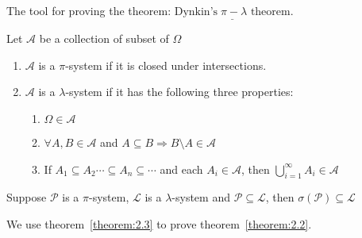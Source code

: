 \documentclass[11pt]{article}
\begin{document}
\vspace*{5mm}
The tool for proving the theorem: $\underline{\text{Dynkin's} \;\pi-\lambda \text{ theorem}}$.

\begin{definition}
    Let $\mathcal{A}$ be a collection of subset of $\Omega$
    \begin{enumerate}
        \item $\mathcal{A}$ is a $\pi$-system if it is closed under intersections.
        \item $\mathcal{A}$ is a $\lambda$-system if it has the following three properties:
        \begin{enumerate}
            \item $\Omega \in \mathcal{A}$
            \item $\forall A,B \in \mathcal{A}$ and $A \subseteq B \Longrightarrow B \setminus A \in \mathcal{A}$
            \item If $A_1 \subseteq A_2 \cdots \subseteq A_n \subseteq 
            \cdots$ and each $A_{i} \in \mathcal{A}$, then
            $\bigcup_{i=1}^{\infty} A_{i} \in \mathcal{A}$
        \end{enumerate}
    \end{enumerate}
\end{definition}

\begin{theorem}
    \label{theorem:2.3}
    Suppose $\mathcal{P}$ is a $\pi$-system, $\mathcal{L}$ is a $\lambda$-system and $\mathcal{P} \subseteq \mathcal{L}$,
    then $\sigma(\mathcal{P}) \subseteq \mathcal{L}$
\end{theorem}
We use theorem~\ref{theorem:2.3} to prove theorem~\ref{theorem:2.2}.
\end{document}

